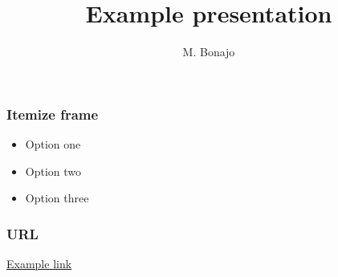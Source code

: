 \documentclass[aspectratio=169]{beamer}
\title{Example presentation}
\institute[FHTenL]{}
\author{M. Bonajo}
\begin{document}
\begin{titleframe}
    \titlepage
\end{titleframe}

\begin{frame}
    \frametitle{Itemize frame}

    \begin{itemize}
        \item Option one
        \item Option two
        \item Option three
    \end{itemize}

\end{frame}

\begin{frame}
    \frametitle{URL}
    \href{http://www.example.com}{Example link}

\end{frame}
\end{document}
